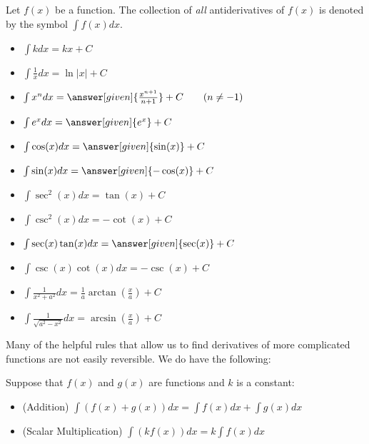 \documentclass[nooutcomes]{ximera}
\begin{document}

\begin{definition}
Let $f(x)$ be a function.  The collection of \emph{all} antiderivatives of $f(x)$ is denoted by the symbol $\int f(x) dx$. 
\end{definition}


\begin{theorem}\hfil
\begin{itemize}
\item $\int k dx = k x + C$
\item $\int \frac{1}{x} dx = \ln|x|+C$
\item $\int x^n dx = \answer[given]{\frac{x^{n+1}}{n+1}}+C\qquad(n\ne-1)$
\item $\int e^x dx = \answer[given]{e^x} + C$
\item $\int \cos(x) dx = \answer[given]{\sin(x)} + C$
\item $\int \sin(x) dx = \answer[given]{-\cos(x)} + C$  
\item $\int \sec^2(x) dx =\tan(x) + C$
\item $\int \csc^2(x) dx = -\cot(x) + C$
\item $\int \sec(x)\tan(x) dx = \answer[given]{\sec(x)} + C$
\item $\int \csc(x)\cot(x) dx = -\csc(x) + C$
\item $\int \frac{1}{x^2+a^2} dx = \frac{1}{a}\arctan\left(\frac{x}{a}\right) + C$
\item $\int \frac{1}{\sqrt{a^2-x^2}} dx = \arcsin\left(\frac{x}{a}\right)+C$
\end{itemize}
\end{theorem}


Many of the helpful rules that allow us to find derivatives of more complicated functions are not easily reversible.  We do have the following:

\begin{theorem} 
Suppose that $f(x)$ and $g(x)$ are functions and $k$ is a constant:
\begin{itemize}
\item (Addition) $\int \left(f(x) + g(x) \right) dx = \int f(x) dx+\int g(x)  dx$
\item (Scalar Multiplication) $\int \left(k f(x)\right) dx = k \int f(x) dx$
\end{itemize}
\end{theorem}
\end{document}
